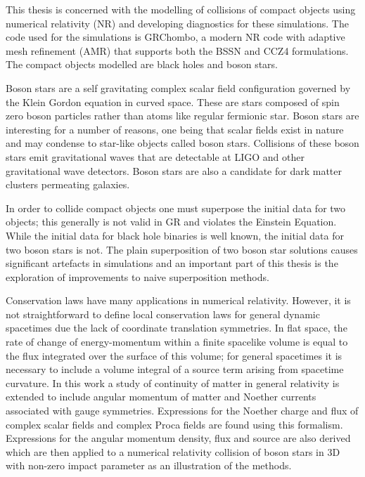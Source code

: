 \documentclass[11pt]{report}  %
\numberwithin{equation}{section}
\begin{document}
This thesis is concerned with the modelling of collisions of compact objects using numerical relativity (NR) and developing diagnostics for these simulations. The code used for the simulations is GRChombo, a modern NR code with adaptive mesh refinement (AMR) that supports both the BSSN and CCZ4 formulations. The compact objects modelled are black holes and boson stars. 

Boson stars are a self gravitating complex scalar field configuration governed by the Klein Gordon equation in curved space. These are stars composed of spin zero boson particles rather than atoms like regular fermionic star. Boson stars are interesting for a number of reasons, one being that scalar fields exist in nature and may condense to star-like objects called boson stars. Collisions of these boson stars emit gravitational waves that are detectable at LIGO and other gravitational wave detectors. Boson stars are also a candidate for dark matter clusters permeating galaxies.

In order to collide compact objects one must superpose the initial data for two objects; this generally is not valid in GR and violates the Einstein Equation. While the initial data for black hole binaries is well known, the initial data for two boson stars is not. The plain superposition of two boson star solutions causes significant artefacts in simulations and an important part of this thesis is the exploration of improvements to naive superposition methods. 

Conservation laws have many applications in numerical relativity. However, it is not straightforward to define local conservation laws for general dynamic spacetimes due the lack of coordinate translation symmetries. In flat space, the rate of change of energy-momentum within a finite spacelike volume is equal to the flux integrated over the surface of this volume; for general spacetimes it is necessary to include a volume integral of a source term arising from spacetime curvature. In this work a study of continuity of matter in general relativity is extended to include angular momentum of matter and Noether currents associated with gauge symmetries. Expressions for the Noether charge and flux of complex scalar fields and complex Proca fields are found using this formalism. Expressions for the angular momentum density, flux and source are also derived which are then applied to a numerical relativity collision of boson stars in 3D with non-zero impact parameter as an illustration of the methods.
\end{document}
